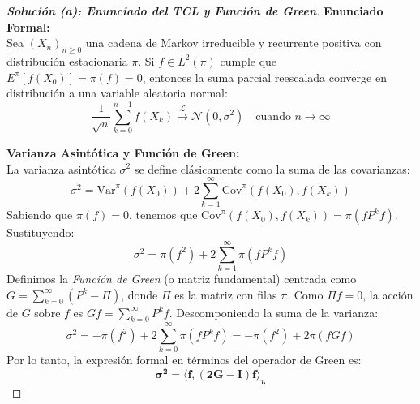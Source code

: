 \documentclass[10pt,a4paper]{article}
\begin{document}
\begin{proof}[\textbf{Solución (a): Enunciado del TCL y Función de Green}]
    \textbf{Enunciado Formal:} \\
    Sea $(X_n)_{n \ge 0}$ una cadena de Markov irreducible y recurrente positiva con distribución estacionaria $\pi$. Si $f \in L^2(\pi)$ cumple que $E^\pi[f(X_0)] = \pi(f) = 0$, entonces la suma parcial reescalada converge en distribución a una variable aleatoria normal:
    \[ \frac{1}{\sqrt{n}} \sum_{k=0}^{n-1} f(X_k) \xrightarrow{\mathcal{L}} \mathcal{N}(0, \sigma^2) \quad \text{cuando } n \to \infty \]
    
    \textbf{Varianza Asintótica y Función de Green:} \\
    La varianza asintótica $\sigma^2$ se define clásicamente como la suma de las covarianzas:
    \[ \sigma^2 = \text{Var}^\pi(f(X_0)) + 2 \sum_{k=1}^\infty \text{Cov}^\pi(f(X_0), f(X_k)) \]
    Sabiendo que $\pi(f) = 0$, tenemos que $\text{Cov}^\pi(f(X_0), f(X_k)) = \pi(f P^k f)$. Sustituyendo:
    \[ \sigma^2 = \pi(f^2) + 2 \sum_{k=1}^\infty \pi(f P^k f) \]
    Definimos la \textit{Función de Green} (o matriz fundamental) centrada como $G = \sum_{k=0}^\infty (P^k - \Pi)$, donde $\Pi$ es la matriz con filas $\pi$. Como $\Pi f = 0$, la acción de $G$ sobre $f$ es $Gf = \sum_{k=0}^\infty P^k f$. 
    Descomponiendo la suma de la varianza:
    \[ \sigma^2 = -\pi(f^2) + 2 \sum_{k=0}^\infty \pi(f P^k f) = -\pi(f^2) + 2\pi(f G f) \]
    Por lo tanto, la expresión formal en términos del operador de Green es:
    \[ \mathbf{\sigma^2 = \langle f, (2G - I)f \rangle_\pi} \]
\end{proof}

\vspace{5mm}
\end{document}
